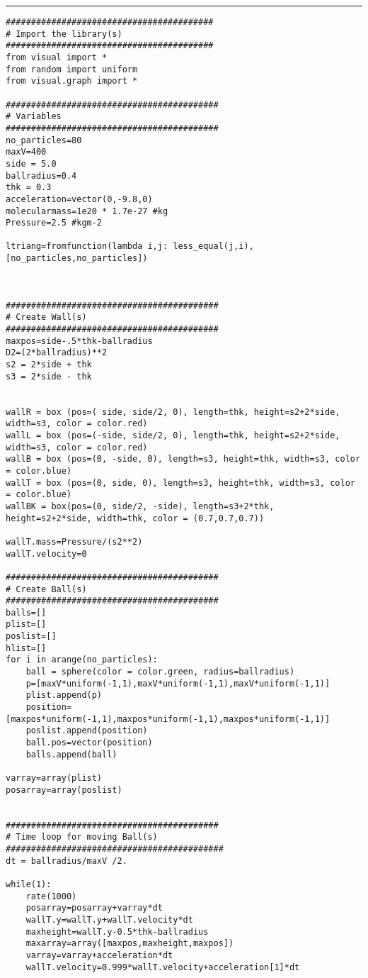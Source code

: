 \documentclass[a4]{article}
\begin{document}
{\color{code}\hrule
\begin{verbatim}
#########################################
# Import the library(s)
#########################################
from visual import *
from random import uniform
from visual.graph import *

##########################################
# Variables
##########################################
no_particles=80
maxV=400
side = 5.0
ballradius=0.4
thk = 0.3
acceleration=vector(0,-9.8,0)
molecularmass=1e20 * 1.7e-27 #kg
Pressure=2.5 #kgm-2

ltriang=fromfunction(lambda i,j: less_equal(j,i),[no_particles,no_particles])



##########################################
# Create Wall(s)
##########################################
maxpos=side-.5*thk-ballradius
D2=(2*ballradius)**2
s2 = 2*side + thk
s3 = 2*side - thk


wallR = box (pos=( side, side/2, 0), length=thk, height=s2+2*side, width=s3, color = color.red)
wallL = box (pos=(-side, side/2, 0), length=thk, height=s2+2*side, width=s3, color = color.red)
wallB = box (pos=(0, -side, 0), length=s3, height=thk, width=s3, color = color.blue)
wallT = box (pos=(0, side, 0), length=s3, height=thk, width=s3, color = color.blue)
wallBK = box(pos=(0, side/2, -side), length=s3+2*thk, height=s2+2*side, width=thk, color = (0.7,0.7,0.7))

wallT.mass=Pressure/(s2**2)
wallT.velocity=0

##########################################
# Create Ball(s)
##########################################
balls=[]
plist=[]
poslist=[]
hlist=[]
for i in arange(no_particles):
    ball = sphere(color = color.green, radius=ballradius)
    p=[maxV*uniform(-1,1),maxV*uniform(-1,1),maxV*uniform(-1,1)]
    plist.append(p)
    position=[maxpos*uniform(-1,1),maxpos*uniform(-1,1),maxpos*uniform(-1,1)]
    poslist.append(position)
    ball.pos=vector(position)
    balls.append(ball)

varray=array(plist)
posarray=array(poslist)


##########################################
# Time loop for moving Ball(s)
###########################################
dt = ballradius/maxV /2.

while(1):
    rate(1000)
    posarray=posarray+varray*dt
    wallT.y=wallT.y+wallT.velocity*dt
    maxheight=wallT.y-0.5*thk-ballradius
    maxarray=array([maxpos,maxheight,maxpos])
    varray=varray+acceleration*dt
    wallT.velocity=0.999*wallT.velocity+acceleration[1]*dt


\end{verbatim}}
\end{document}
